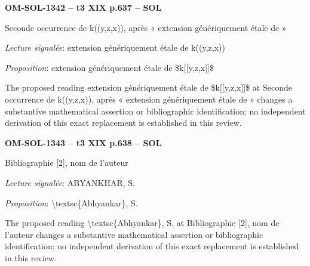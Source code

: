 \par\noindent\textbf{OM-SOL-1342 -- t3 XIX p.637 -- SOL}\par
Seconde occurrence de k((y,z,x)), après « extension génériquement étale de »\par
\emph{Lecture signalée}: extension génériquement étale de k((y,z,x))\par
\emph{Proposition}: extension génériquement étale de \$k[[y,z,x]]\$\par
The proposed reading extension génériquement étale de \$k[[y,z,x]]\$ at Seconde occurrence de k((y,z,x)), après « extension génériquement étale de » changes a substantive mathematical assertion or bibliographic identification; no independent derivation of this exact replacement is established in this review.\par
\par\noindent\textbf{OM-SOL-1343 -- t3 XIX p.638 -- SOL}\par
Bibliographie [2], nom de l'auteur\par
\emph{Lecture signalée}: ABYANKHAR, S.\par
\emph{Proposition}: \textbackslash{}textsc\{Abhyankar\}, S.\par
The proposed reading \textbackslash{}textsc\{Abhyankar\}, S. at Bibliographie [2], nom de l'auteur changes a substantive mathematical assertion or bibliographic identification; no independent derivation of this exact replacement is established in this review.\par
\endgroup
